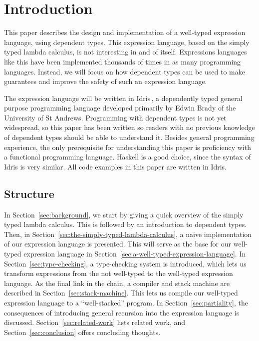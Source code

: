 \section{Introduction}
\label{sec:introduction}

This paper describes the design and implementation of a well-typed expression language, using dependent types. This expression language, based on the simply typed lambda calculus, is not interesting in and of itself. Expressions languages like this have been implemented thousands of times in as many programming languages. Instead, we will focus on how dependent types can be used to make guarantees and improve the safety of such an expression language.

The expression language will be written in Idris\,\cite{Idris}, a dependently typed general purpose programming language developed primarily by Edwin Brady of the University of St Andrews. Programming with dependent types is not yet widespread, so this paper has been written so readers with no previous knowledge of dependent types should be able to understand it. Besides general programming experience, the only prerequisite for understanding this paper is proficiency with a functional programming language. Haskell is a good choice, since the syntax of Idris is very similar. All code examples in this paper are written in Idris.

\subsection{Structure}
In Section~\ref{sec:background}, we start by giving a quick overview of the simply typed lambda calculus. This is followed by an introduction to dependent types. Then, in Section~\ref{sec:the-simply-typed-lambda-calculus}, a naive implementation of our expression language is presented. This will serve as the base for our well-typed expression language in Section~\ref{sec:a-well-typed-expression-language}. In Section~\ref{sec:type-checking}, a type-checking system is introduced, which lets us transform expressions from the not well-typed to the well-typed expression language. As the final link in the chain, a compiler and stack machine are described in Section~\ref{sec:stack-machine}. This lets us compile our well-typed expression language to a ``well-stacked'' program. In Section~\ref{sec:partiality}, the consequences of introducing general recursion into the expression language is discussed. Section~\ref{sec:related-work} lists related work, and Section~\ref{sec:conclusion} offers concluding thoughts.